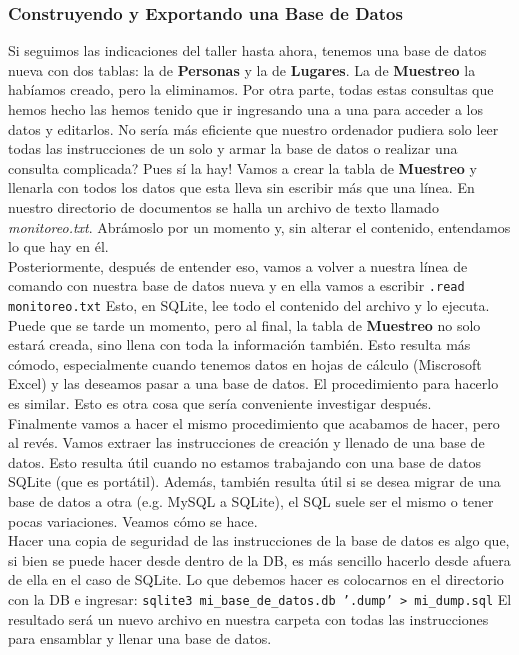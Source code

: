 \documentclass[10pt,letterpaper]{article}
\newcommand{\inlinecode}[1]{
\colorbox{light-gray}{\texttt{#1}}
}
\begin{document}
\subsubsection{Construyendo y Exportando una Base de Datos}
Si seguimos las indicaciones del taller hasta ahora, tenemos una base de datos nueva con dos tablas: la de \textbf{Personas} y la de \textbf{Lugares}. La de \textbf{Muestreo} la hab\'iamos creado, pero la eliminamos. Por otra parte, todas estas consultas que hemos hecho las hemos tenido que ir ingresando una a una para acceder a los datos y editarlos. No ser\'ia m\'as eficiente que nuestro ordenador pudiera solo leer todas las instrucciones de un solo y armar la base de datos o realizar una consulta complicada? Pues s\'i la hay! Vamos a crear la tabla de \textbf{Muestreo} y llenarla con todos los datos que esta lleva sin escribir m\'as que una l\'inea. En nuestro directorio de documentos se halla un archivo de texto llamado \emph{monitoreo.txt}. Abr\'amoslo por un momento y, sin alterar el contenido, entendamos lo que hay en \'el.\\

Posteriormente, despu\'es de entender eso, vamos a volver a nuestra l\'inea de comando con nuestra base de datos nueva y en ella vamos a escribir \inlinecode{.read monitoreo.txt} Esto, en SQLite, lee todo el contenido del archivo y lo ejecuta. Puede que se tarde un momento, pero al final, la tabla de \textbf{Muestreo} no solo estar\'a creada, sino llena con toda la informaci\'on tambi\'en. Esto resulta m\'as c\'omodo, especialmente cuando tenemos datos en hojas de c\'alculo (Miscrosoft Excel) y las deseamos pasar a una base de datos. El procedimiento para hacerlo es similar. Esto es otra cosa que ser\'ia conveniente investigar despu\'es.\\

Finalmente vamos a hacer el mismo procedimiento que acabamos de hacer, pero al rev\'es. Vamos extraer las instrucciones de creaci\'on y llenado de una base de datos. Esto resulta \'util cuando no estamos trabajando con una base de datos SQLite (que es port\'atil). Adem\'as, tambi\'en resulta \'util si se desea migrar de una base de datos a otra (e.g. MySQL a SQLite), el SQL suele ser el mismo o tener pocas variaciones. Veamos c\'omo se hace.\\

Hacer una copia de seguridad de las instrucciones de la base de datos es algo que, si bien se puede hacer desde dentro de la DB, es m\'as sencillo hacerlo desde afuera de ella en el caso de SQLite. Lo que debemos hacer es colocarnos en el directorio con la DB e ingresar: \inlinecode{sqlite3 mi\_base\_de\_datos.db '.dump' >\ mi\_dump.sql} El resultado ser\'a un nuevo archivo en nuestra carpeta con todas las instrucciones para ensamblar y llenar una base de datos.\\
\end{document}
